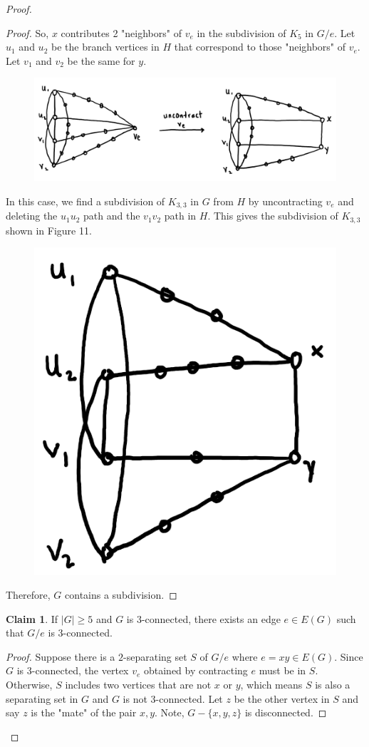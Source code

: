 \documentclass[12pt]{article}
\theoremstyle{definition}
\newtheorem{claim}{Claim}
\begin{document}
\begin{proof}
\begin{proof}
        So, $x$ contributes 2 "neighbors" of $v_e$ in the subdivision of $K_5$ in $G/e$. Let $u_1$ and $u_2$ be the branch vertices in $H$ that correspond to those "neighbors" of $v_e$. Let $v_1$ and $v_2$ be the same for $y$.
        \begin{figure}[hbt!]
            \centering
            \includegraphics[width=0.8\linewidth]{graphs/uncontracted.png}
            \caption{}
        \end{figure}

        In this case, we find a subdivision of $K_{3,3}$ in $G$ from $H$ by uncontracting $v_e$ and deleting the $u_1u_2$ path and the $v_1v_2$ path in $H$. This gives the subdivision of $K_{3,3}$ shown in Figure 11.
        \begin{figure}[hbt!]
            \centering
            \includegraphics[width=0.25\linewidth]{graphs/subdivision_K_3,3_1.png}
            \caption{}
        \end{figure}

        Therefore, $G$ contains a subdivision.

        \end{proof}

        \begin{greenbox}
            \begin{claim}
                If $|G| \geq 5$ and $G$ is 3-connected, there exists an edge $e \in E(G)$ such that $G/e$ is 3-connected.
            \end{claim}
        \end{greenbox}
        \begin{proof}
            Suppose there is a $2$-separating set $S$ of $G/e$ where $e = xy \in E(G)$. Since $G$ is 3-connected, the vertex $v_e$ obtained by contracting $e$ must be in $S$.
            Otherwise, $S$ includes two vertices that are not $x$ or $y$, which means $S$ is also a separating set in $G$ and $G$ is not 3-connected.
            Let $z$ be the other vertex in $S$ and say $z$ is the "mate" of the pair $x,y$. Note, $G - \{x,y,z\}$ is disconnected.


\end{proof}
\end{proof}
\end{document}
